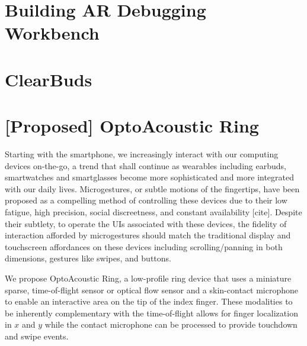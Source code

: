 \documentclass [11pt, proquest] {uwthesis}[2020/02/24]
\begin{document}
\chapter{Building AR Debugging Workbench}


\chapter{ClearBuds}


\chapter{[Proposed] OptoAcoustic Ring}

Starting with the smartphone, we increasingly interact with our computing devices on-the-go, a trend that shall continue as wearables including earbuds, smartwatches and smartglasses become more sophisticated and more integrated with our daily lives. Microgestures, or subtle motions of the fingertips, have been proposed as a compelling method of controlling these devices due to their low fatigue, high precision, social discreetness, and constant availability [cite].
Despite their subtlety, to operate the UIs associated with these devices, the fidelity of interaction afforded by microgestures should match the traditional display and touchscreen affordances on these devices including scrolling/panning in both dimensions, gestures like swipes, and buttons.

We propose OptoAcoustic Ring, a low-profile ring device that uses a miniature sparse, time-of-flight sensor or optical flow sensor and a skin-contact microphone to enable an interactive area on the tip of the index finger. These modalities to be inherently complementary with the time-of-flight allows for finger localization in $x$ and $y$ while the contact microphone can be processed to provide touchdown and swipe events.  
\end{document}
